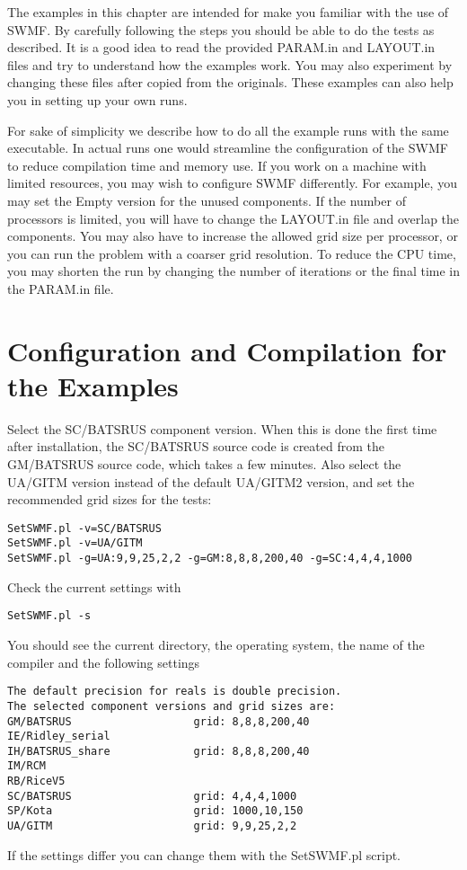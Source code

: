 The examples in this chapter are intended for make you familiar
with the use of SWMF. By carefully following the steps you should
be able to do the tests as described. It is a good idea to read the
provided PARAM.in and LAYOUT.in files and try to understand how
the examples work. You may also experiment by changing these files
after copied from the originals. These examples can also help you
in setting up your own runs.

For sake of simplicity we describe how to do all the example runs with the
same executable. In actual runs one would streamline the configuration
of the SWMF to reduce compilation time and memory use. If you work
on a machine with limited resources, you may wish to configure SWMF
differently. For example, you may set the Empty version for the unused
components. If the number of processors is limited, you will have to
change the LAYOUT.in file and overlap the components. You may also have to 
increase the allowed grid size per processor, or you can run the problem with 
a coarser grid resolution. To reduce the CPU time, you may shorten the 
run by changing the number of iterations or the final time in the 
PARAM.in file.

\section{Configuration and Compilation for the Examples}

Select the SC/BATSRUS component version. When this is done the first time
after installation, the SC/BATSRUS source code is created from the GM/BATSRUS
source code, which takes a few minutes. Also select 
the UA/GITM version instead of the default UA/GITM2 version, 
and set the recommended grid sizes for the tests:
\begin{verbatim}
SetSWMF.pl -v=SC/BATSRUS
SetSWMF.pl -v=UA/GITM
SetSWMF.pl -g=UA:9,9,25,2,2 -g=GM:8,8,8,200,40 -g=SC:4,4,4,1000
\end{verbatim}
Check the current settings with
\begin{verbatim}
SetSWMF.pl -s
\end{verbatim}
You should see the current directory, the operating system, the name
of the compiler and the following settings
\begin{verbatim}
The default precision for reals is double precision.
The selected component versions and grid sizes are:
GM/BATSRUS                   grid: 8,8,8,200,40
IE/Ridley_serial             
IH/BATSRUS_share             grid: 8,8,8,200,40
IM/RCM                       
RB/RiceV5                    
SC/BATSRUS                   grid: 4,4,4,1000
SP/Kota                      grid: 1000,10,150
UA/GITM                      grid: 9,9,25,2,2
\end{verbatim}
If the settings differ you can change them with the SetSWMF.pl script.


